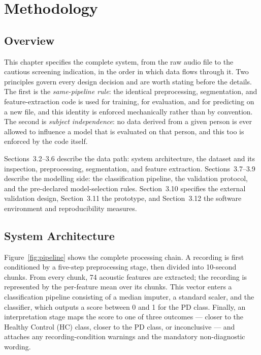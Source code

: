 \chapter{Methodology}

\section{Overview}

This chapter specifies the complete system, from the raw audio file to
the cautious screening indication, in the order in which data flows
through it. Two principles govern every design decision and are worth
stating before the details. The first is the \emph{same-pipeline rule}:
the identical preprocessing, segmentation, and feature-extraction code
is used for training, for evaluation, and for predicting on a new
file, and this identity is enforced mechanically rather than by
convention. The second is \emph{subject independence}: no data derived
from a given person is ever allowed to influence a model that is
evaluated on that person, and this too is enforced by the code itself.

Sections~3.2--3.6 describe the data path: system architecture, the
dataset and its inspection, preprocessing, segmentation, and feature
extraction. Sections~3.7--3.9 describe the modelling side: the
classification pipeline, the validation protocol, and the pre-declared
model-selection rules. Section~3.10 specifies the external validation
design, Section~3.11 the prototype, and Section~3.12 the software
environment and reproducibility measures.

\section{System Architecture}

Figure~\ref{fig:pipeline} shows the complete processing chain. A
recording is first conditioned by a five-step preprocessing stage, then
divided into 10-second chunks. From every chunk, 74 acoustic features
are extracted; the recording is represented by the per-feature mean
over its chunks. This vector enters a classification pipeline
consisting of a median imputer, a standard scaler, and the classifier,
which outputs a score between 0 and 1 for the PD class. Finally, an
interpretation stage maps the score to one of three outcomes ---
closer to the Healthy Control (HC) class, closer to the PD class, or
inconclusive --- and attaches any recording-condition warnings and the
mandatory non-diagnostic wording.

